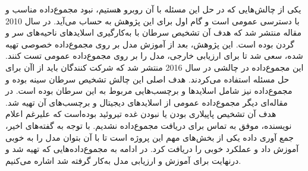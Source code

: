 
یکی از چالش‌هایی که در حل این مسئله با آن روبرو هستیم، نبود مجموع‌داده مناسب و با دسترسی عمومی است و گام اول برای این پژوهش به حساب می‌آید.
در سال 2010 مقاله \cite{halicek2019head} منتشر شد که هدف آن تشخیص سرطان با به‌کارگیری اسلاید‌های ناحیه‌های سر و گردن بوده است.
این پژوهش، بعد از آموزش مدل بر روی مجموع‌داده خصوصی تهیه شده، سعی شد تا برای ارزیابی خارجی، مدل را بر روی مجموع‌داده عمومی  تست کنند. این مجموع‌داده در چالشی در سال 2016 منتشر شد که شرکت کنندگان باید از اآن برای حل مسئله استفاده می‌کردند. هدف اصلی این چالش تشخیص سرطان سینه بوده و مجموع‌داده نیز شامل اسلاید‌ها و برچسب‌هایی مربوط به این سرطان بوده است.
در مقاله‌ای دیگر \cite{bohland2021machine} مجموع‌داده عمومی از اسلاید‌های دیجیتال و برچسب‌های آن تهیه شد. هدف آن تشخیص پاپیلاری بودن یا نبودن غده تیروئید بوده‌است که علیرغم اعلام نویسنده، موفق به تماس برای دریافت مجموع‌داده نشدیم.
با توجه به گفته‌های اخیر، جمع آوری داده یکی از بخش‌های مهم این پروژه است تا با آن بتوان مدل را به خوبی آموزش داد و عملکرد خوبی را دریافت کرد.
در ادامه به مجموع‌داده‌هایی که تهیه شد و درنهایت برای آموزش و ارزیابی مدل به‌کار گرفته شد اشاره می‌کنیم.



